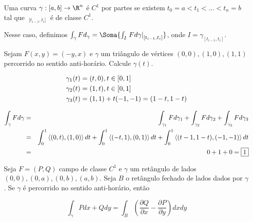\documentclass{book}
\begin{document}
\begin{defn}
\begin{sloppypar}
Uma curva $\gamma: [a,b] \to \R^n$ \'e $C^1$ por partes se existem ${t_0 = a < t_1 < \ldots < t_n = b}$ tal que $\mathop {\left. \gamma  \right|}\nolimits_{]t_{i - 1} ,t_i [}$ \'e de classe $C^1$.
\end{sloppypar}


Nesse caso, definimos $\int_\gamma F d_\gamma = \Soma{\int_I {\mathop {\left. {Fd\gamma } \right|}\nolimits_{[t_{i - 1} ,t_i ]} }}$, onde $I = \gamma_{[t_{i - 1} ,t_i ]}$.
\end{defn}

\begin{ex}
Sejam $F(x,y) = (-y,x)$ e $\gamma$ um tri\^angulo de v\'ertices $(0,0),(1,0),(1,1)$ percorrido no sentido anti-hor\'ario. Calcule $\gamma(t)$.

\end{ex}

\begin{sol}
\[
\begin{gathered}
  \gamma _1 (t) = (t,0),t \in [0,1] \hfill \\
  \gamma _2 (t) = (1,t),t \in [0,1] \hfill \\
  \gamma _3 (t) = (1,1) + t( - 1, - 1) = (1 - t,1 - t) \hfill \\ 
\end{gathered} 
\]

\begin{eqnarray*}
  \int_\gamma  {Fd\gamma }  &=& \int_{\gamma _1 } {Fd\gamma _1 }  + \int_{\gamma _2 } {Fd\gamma _2 }  + \int_{\gamma _3 } {Fd\gamma _3 }  \hfill \\
   &=& \int_0^1 {\left\langle {(0,t),(1,0)} \right\rangle dt}  + \int_0^1 {\left\langle {( - t,1),(0,1)} \right\rangle dt}  + \int_0^1 {\left\langle {(t - 1,1 - t),( - 1, - 1)} \right\rangle dt}  \hfill \\
   &=& 0 + 1 + 0 = \boxed1 \hfill \\ 
\end{eqnarray*}

\end{sol}

\newpage 

\begin{prop}
Seja $F = (P,Q)$ campo de classe $C^1$ e $\gamma$ um ret\^angulo de lados $(0,0),(0,a),(0,b),(a,b)$. Seja $B$ o ret\^angulo fechado de lados dados por $\gamma$. Se $\gamma$ \'e percorrido no sentido anti-hor\'ario, ent\~ao

\[
\int_\gamma  {Pdx + Qdy}  = \int_B {\left( {\frac{{\partial Q}}
{{\partial x}} - \frac{{\partial P}}
{{\partial y}}} \right)dxdy} 
\]

\end{prop}
\end{document}

